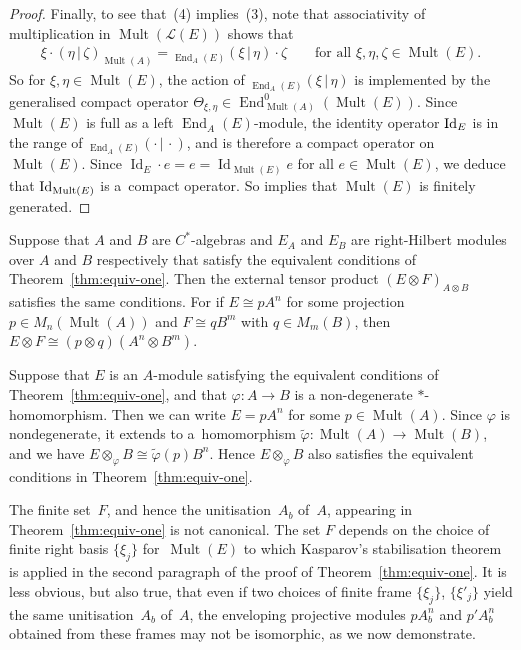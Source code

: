 \documentclass[10pt,a4paper]{amsart}
\numberwithin{equation}{section}
\DeclareMathOperator{\End}{End} %
\DeclareMathOperator{\Id}{Id} %
\DeclareMathOperator{\Mult}{Mult} %
\renewcommand{\L}{\mathcal{L}}
\newcommand{\ox}{\otimes} %
\begin{document}
\begin{proof}
Finally, to see that~(4) implies~(3), note that associativity of multiplication in $\Mult(\L(E))$ shows that
\begin{gather*}
\xi \cdot (\eta \,|\, \zeta)_{\Mult(A)} = {_{\End_A(E)}(\xi \,|\, \eta)\cdot\zeta} \qquad\text{for all $\xi,\eta,\zeta \in \Mult(E)$.}
\end{gather*}
So for $\xi,\eta \in \Mult(E)$, the action of ${_{\End_A(E)}(\xi \,|\, \eta)}$ is implemented by the generalised compact operator $\Theta_{\xi, \eta} \in \End^0_{\Mult(A)}(\Mult(E))$. Since $\Mult(E)$ is full as a left $\End_A(E)$-module, the identity operator ${\rm Id}_E$ is in the range of ${_{\End_A(E)}(\cdot \,|\, \cdot)}$, and is therefore a compact operator on~$\Mult(E)$. Since $\Id_E \cdot e = e = \Id_{\Mult(E)} e$ for all $e \in \Mult(E)$, we deduce that ${\rm Id}_{\Mult(E)}$ is a~compact operator. So \cite[Theorem~8.1.27]{BleM} implies that $\Mult(E)$ is f\/initely generated.
\end{proof}


\begin{rmk} Suppose that $A$ and $B$ are $C^*$-algebras and $E_A$ and $E_B$ are right-Hilbert modules over $A$ and $B$ respectively that satisfy the equivalent conditions of Theorem~\ref{thm:equiv-one}. Then the external tensor product $(E\ox F)_{A\ox B}$ satisf\/ies the same conditions. For if $E\cong pA^n$ for some projection $p\in M_n(\Mult(A))$ and $F\cong qB^m$ with $q\in M_m(B)$, then $E\ox F\cong (p\ox q)(A^n\ox B^m)$.
\end{rmk}

\begin{rmk} Suppose that $E$ is an $A$-module satisfying the equivalent conditions of Theo\-rem~\ref{thm:equiv-one}, and that $\varphi \colon A \to B$ is a non-degenerate $*$-homomorphism. Then we can write $E = p A^n$ for some $p \in \Mult(A)$. Since $\varphi$ is nondegenerate, it extends to a~homomorphism $\tilde\varphi \colon \Mult(A) \to \Mult(B)$, and we have $E\ox_{\varphi}B\cong \tilde\varphi(p)B^n$. Hence $E\ox_{\varphi}B$ also satisf\/ies the equivalent conditions in Theorem~\ref{thm:equiv-one}.
\end{rmk}

The f\/inite set~$F$, and hence the unitisation~$A_b$ of~$A$, appearing in Theorem~\ref{thm:equiv-one} is not canonical. The set $F$ depends on the choice of f\/inite right basis $\{\xi_j\}$ for~$\Mult(E)$ to which Kasparov's stabilisation theorem is applied in the second paragraph of the proof of Theorem~\ref{thm:equiv-one}. It is less obvious, but also true, that even if two choices of f\/inite frame $\{\xi_j\}$, $\{\xi'_j\}$ yield the same unitisation~$A_b$ of~$A$, the enveloping projective modules $p A_b^n$ and $p'A_b^n$ obtained from these frames may not be isomorphic, as we now
demonstrate.
\end{document}
